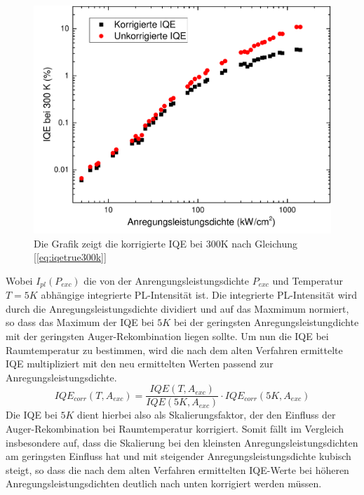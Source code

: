 \begin{figure}[htb]
\centering
    \begin{minipage}[t]{0.49\linewidth}
        \includegraphics[width=\linewidth]{Bilder/KorrigierteIQE300K.pdf}
        \caption{Die Grafik zeigt die korrigierte IQE bei 300K nach Gleichung [\ref{eq:iqetrue300k}] }
        \label{fig:trueiqe300k}
    \end{minipage}
\end{figure}
\vspace{0.1cm}
\noindent
%
Wobei $I_{pl}(P_{exc})$ die von der Anrengungsleistungsdichte $P_{exc}$ und Temperatur $T = 5K$ abhängige integrierte PL-Intensität ist. Die integrierte PL-Intensität wird durch die Anregungsleistungsdichte dividiert und auf das Maxmimum normiert, so dass das Maximum der IQE bei $5K$ bei der geringsten Anregungsleistungdichte mit der geringsten Auger-Rekombination liegen sollte. Um nun die IQE bei Raumtemperatur zu bestimmen, wird die nach dem alten Verfahren ermittelte IQE multipliziert mit den neu ermittelten Werten passend zur Anregungsleistungsdichte. 
%
\begin{equation}
    IQE_{corr}(T, A_{exc}) = \frac{IQE(T,A_{exc})}{IQE(5K,A_{exc})} \cdot IQE_{corr}(5K,A_{exc})
    \label{eq:iqetrue300k}
\end{equation}
%
Die IQE bei $5K$ dient hierbei also als Skalierungsfaktor, der den Einfluss der Auger-Rekombination bei Raumtemperatur korrigiert. Somit fällt im Vergleich insbesondere auf, dass die Skalierung bei den kleinsten Anregungsleistungsdichten am geringsten Einfluss hat und mit steigender Anregungsleistungsdichte kubisch steigt, so dass die nach dem alten Verfahren ermittelten IQE-Werte bei höheren Anregungsleistungsdichten deutlich nach unten korrigiert werden müssen. 
